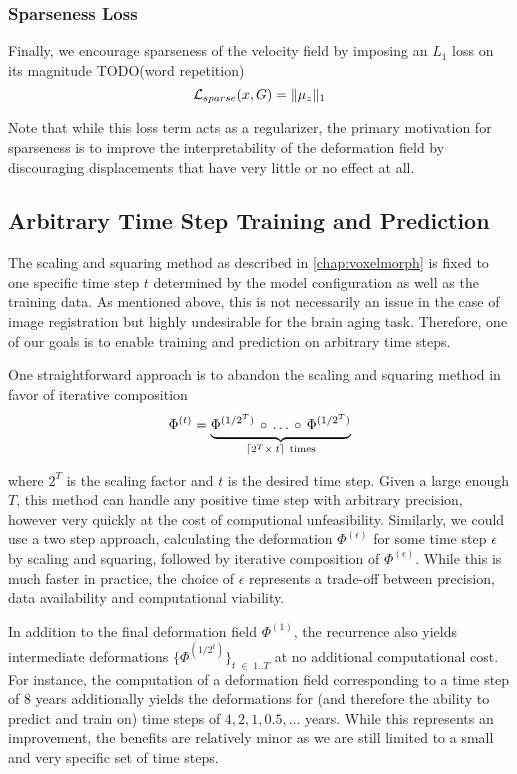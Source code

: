 \subsubsection*{Sparseness Loss}
Finally, we encourage sparseness of the velocity field by imposing an $L_1$ loss on its magnitude TODO(word repetition)
\begin{equation}
	\mathcal{L}_{sparse}( x, G ) = \lVert\mu_z\rVert_1
\end{equation}

Note that while this loss term acts as a regularizer, the primary motivation for sparseness is to improve the interpretability of the deformation field by discouraging displacements that have very little or no effect at all.

\subsection{Arbitrary Time Step Training and Prediction}
The scaling and squaring method as described in \autoref{chap:voxelmorph} is fixed to one specific time step $t$ determined by the model configuration as well as the training data. As mentioned above, this is not necessarily an issue in the case of image registration but highly undesirable for the brain aging task. Therefore, one of our goals is to enable training and prediction on arbitrary time steps.

One straightforward approach is to abandon the scaling and squaring method in favor of iterative composition
\begin{equation}
	\Phi^{(t)} =
	\underbrace{
		\Phi^{(1 / 2^T)} \, \circ \, \ldots \, \circ \, \Phi^{(1 / 2^T)} \vphantom{\Phi^{(1 / 2^T)}_2}
	}_{\lceil 2^T \times \: t \rceil \ \text{times}}
\end{equation}

where $2^T$ is the scaling factor and $t$ is the desired time step. Given a large enough $T$, this method can handle any positive time step with arbitrary precision, however very quickly at the cost of computional unfeasibility. Similarly, we could use a two step approach, calculating the deformation $\Phi^{(\epsilon)}$ for some time step $\epsilon$ by scaling and squaring, followed by iterative composition of $\Phi^{(\epsilon)}$. While this is much faster in practice, the choice of $\epsilon$ represents a trade-off between precision, data availability and computational viability.

In addition to the final deformation field $\Phi^{(1)}$, the recurrence also yields intermediate deformations $\{ \Phi^{(1 / 2^{t})} \}_{t \; \in \; 1 .. T} $ at no additional computational cost. For instance, the computation of a deformation field corresponding to a time step of 8 years additionally yields the deformations for (and therefore the ability to predict and train on) time steps of ${ 4, 2, 1, 0.5, \ldots }$ years. While this represents an improvement, the benefits are relatively minor as we are still limited to a small and very specific set of time steps.

